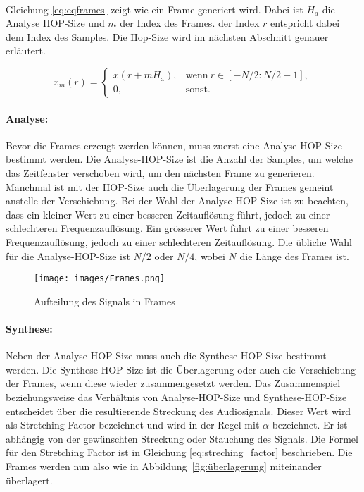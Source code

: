 \paragraph{}
Gleichung \eqref{eq:eqframes} zeigt wie ein Frame generiert wird. Dabei ist $H_a$ die Analyse HOP-Size und $m$ der Index des Frames. der Index $r$ entspricht dabei dem Index des Samples. Die Hop-Size wird im nächsten Abschnitt genauer erläutert.

\begin{equation}
    \label{eq:eqframes}
    x_m(r)=
    \begin{cases}
        x(r+mH_\mathrm{a}), & \mathrm{wenn~}r\in[-N/2:N/2-1], \\0,&\text{sonst.}
    \end{cases}
\end{equation}

\paragraph{Analyse:}
Bevor die Frames erzeugt werden können, muss zuerst eine Analyse-HOP-Size bestimmt werden. Die Analyse-HOP-Size ist die Anzahl der Samples, um welche das Zeitfenster verschoben wird, um den nächsten Frame zu generieren. Manchmal ist mit der HOP-Size auch die Überlagerung der Frames gemeint anstelle der Verschiebung. Bei der Wahl der Analyse-HOP-Size ist zu beachten, dass ein kleiner Wert zu einer besseren Zeitauflösung führt, jedoch zu einer schlechteren Frequenzauflösung. Ein grösserer Wert führt zu einer besseren Frequenzauflösung, jedoch zu einer schlechteren Zeitauflösung. Die übliche Wahl für die Analyse-HOP-Size ist \(N/2\) oder \(N/4\), wobei \(N\) die Länge des Frames ist.

\begin{figure}[H]
    \centering
    \texttt{[image: images/Frames.png]}
    \caption{Aufteilung des Signals in Frames}
    \label{fig:frames}
\end{figure}


\paragraph{Synthese:}
Neben der Analyse-HOP-Size muss auch die Synthese-HOP-Size bestimmt werden. Die Synthese-HOP-Size ist die Überlagerung oder auch die Verschiebung der Frames, wenn diese wieder zusammengesetzt werden. Das Zusammenspiel beziehungsweise das Verhältnis von Analyse-HOP-Size und Synthese-HOP-Size entscheidet über die resultierende Streckung des Audiosignals. Dieser Wert wird als Stretching Factor bezeichnet und wird in der Regel mit $\alpha$ bezeichnet. Er ist abhängig von der gewünschten Streckung oder Stauchung des Signals. Die Formel für den Stretching Factor ist in Gleichung \eqref{eq:streching_factor} beschrieben. Die Frames werden nun also wie in Abbildung~\ref{fig:überlagerung} miteinander überlagert.

